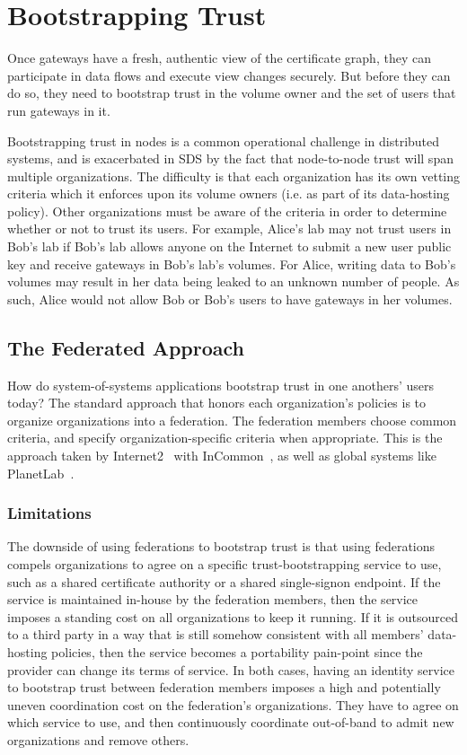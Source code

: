 \section{Bootstrapping Trust}
\label{sec:bootstrapping-trust}

Once gateways have a fresh, authentic view of the certificate graph, they can
participate in data flows and execute view changes securely.  But before they
can do so, they need to bootstrap trust in the volume owner and the set of users
that run gateways in it.

Bootstrapping trust in nodes is a common operational challenge in
distributed systems, and is exacerbated in SDS by the fact that node-to-node
trust will span multiple organizations.
The difficulty is that each organization has its own vetting criteria which it
enforces upon its volume owners (i.e. as part of its data-hosting policy).
Other organizations must be aware of the criteria in order to determine
whether or not to trust its users.  For example, Alice's lab may
not trust users in Bob's lab if Bob's lab allows anyone on the Internet
to submit a new user public key and receive gateways in Bob's
lab's volumes.  For Alice, writing data to Bob's volumes may result in her data
being leaked to an unknown number of people.  As such, Alice would not allow Bob
or Bob's users to have gateways in her volumes.

\subsection{The Federated Approach}

How do system-of-systems applications bootstrap trust in one anothers' users
today?  The standard approach that honors each organization's policies is to organize
organizations into a federation.  The federation members choose common criteria,
and specify organization-specific criteria when appropriate.  This is the
approach taken by Internet2~\cite{internet2} with InCommon~\cite{incommon}, as
well as global systems like PlanetLab~\cite{planet-lab}.

\subsubsection{Limitations}

The downside of using federations to bootstrap trust is that using federations compels
organizations to agree on a specific trust-bootstrapping service to use, such as
a shared certificate authority or a shared single-signon endpoint.  If the
service is maintained in-house by the
federation members, then the service imposes a standing cost on all organizations to keep it
running.  If it is outsourced to a third party in a way that is still somehow
consistent with all members' data-hosting policies, then the service becomes a portability
pain-point since the provider can change its terms of service.  In both cases,
having an identity service to bootstrap trust between federation members imposes
a high and potentially uneven coordination cost on the federation's organizations.
They have to agree on which service to use, and then continuously
coordinate out-of-band to admit new organizations and remove others.

